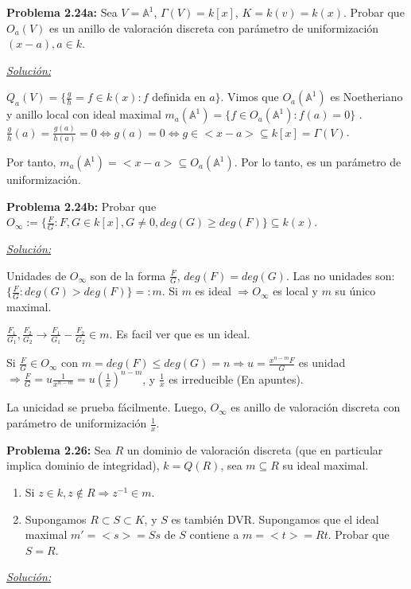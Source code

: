 \textbf{Problema 2.24a:} Sea $V=\mathbb{A}^1$, $\Gamma(V)=k[x]$, $K=k(v)=k(x)$. Probar que $O_a(V)$ es un anillo de valoración discreta con parámetro de uniformización $(x-a),a\in k$. 

\underline{\textit{Solución: }}

$Q_a(V)=\{\frac{g}{h}=f\in k(x): f \text{ definida en } a \}$. Vimos que $O_a(\mathbb{A}^1)$ es Noetheriano y anillo local con ideal maximal $m_a(\mathbb{A}^1)=\{f\in O_a(\mathbb{A}^1): f(a)=0\}$ . $\frac{g}{h}(a)=\frac{g(a)}{h(a)}=0 \Leftrightarrow g(a)=0 \Leftrightarrow g\in <x-a>\subseteq k[x]=\Gamma(V)$. 

Por tanto, $m_a(\mathbb{A}^1)=<x-a>\subseteq O_a(\mathbb{A}^1)$. Por lo tanto, es un parámetro de uniformización. 

\textbf{Problema 2.24b:} Probar que $O_\infty:=\{\frac{F}{G}: F,G\in k[x], G\neq 0, deg(G)\ge deg(F) \}\subseteq k(x)$.

\underline{\textit{Solución: }}

Unidades de $O_\infty$ son de la forma $\frac{F}{G}$, $deg(F)=deg(G)$.  Las no unidades son: $\{\frac{F}{G}: deg(G)>deg(F)\}=:m$. Si $m$ es ideal $\Rightarrow O_\infty$ es local y $m$ su único maximal. 

$\frac{F_1}{G_1},\frac{F_2}{G_2} \rightarrow \frac{F_1}{G_1}-\frac{F_2}{G_2}\in m$. Es facil ver que es un ideal. 

Si $\frac{F}{G}\in O_\infty$ con $m=deg(F)\le deg(G)=n \Rightarrow u=\frac{x^{n-m}F}{G}$ es unidad $\Rightarrow \frac{F}{G}=u\frac{1}{x^{n-m}}=u(\frac{1}{x})^{n-m}$, y $\frac{1}{x}$ es irreducible (En apuntes). 

La unicidad se prueba fácilmente. Luego, $O_\infty$ es anillo de valoración discreta con parámetro de uniformización $\frac{1}{x}$. 

\textbf{Problema 2.26:} Sea $R$ un dominio de valoración discreta (que en particular implica dominio de integridad), $k=Q(R)$, sea $m\subseteq R$ su ideal maximal. 

\begin{enumerate}
\item Si $z\in k,z\notin R \Rightarrow z^{-1}\in m$.
\item Supongamos $R\subset S \subset K$, y $S$ es también DVR. Supongamos que el ideal maximal $m'=<s>=Ss$ de $S$ contiene a $m=<t>=Rt$. Probar que $S=R$.
\end{enumerate}

\underline{\textit{Solución: }}


